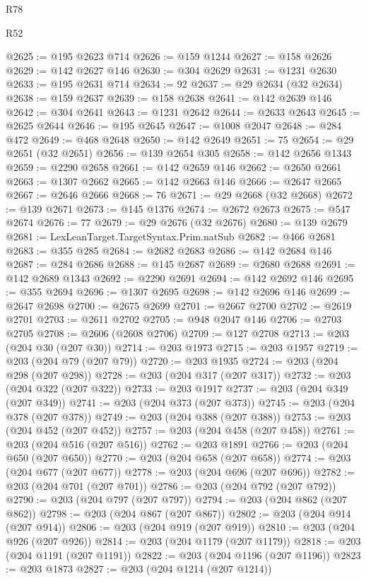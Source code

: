 \begin{lexlean}{R78}
\begin{lexlean}{R52}
\begin{coremodule}
{{{{{{{{{{{{{{{{{{{{{{{{{{{{{{{{{{{{{{{{{{{{{{{{{{{{{{{{{{{{{{{{{{{{{{{{{{{{{{{{{{{{{{{{{{{{{{{{{{{{{{{{{{{{{{{{{{{{{{{{{{{{{{{{{{{{{{{{{{{{{{{{{{{{{{{{{{{{{{{{{{{{{{{{{{{{{{{{{{{{{{{{{{{{{{{{{{{{{{@2625 := @195 @2623 @714
@2626 := @159 @1244
@2627 := @158 @2626
@2629 := @142 @2627 @146
@2630 := @304 @2629
@2631 := @1231 @2630
@2633 := @195 @2631 @714
@2634 := 92
@2637 := @29 @2634 (@32 @2634)
@2638 := @159 @2637
@2639 := @158 @2638
@2641 := @142 @2639 @146
@2642 := @304 @2641
@2643 := @1231 @2642
@2644 := @2633 @2643
@2645 := @2625 @2644
@2646 := @195 @2645
@2647 := @1008 @2047
@2648 := @284 @472
@2649 := @468 @2648
@2650 := @142 @2649
@2651 := 75
@2654 := @29 @2651 (@32 @2651)
@2656 := @139 @2654 @305
@2658 := @142 @2656 @1343
@2659 := @2290 @2658
@2661 := @142 @2659 @146
@2662 := @2650 @2661
@2663 := @1307 @2662
@2665 := @142 @2663 @146
@2666 := @2647 @2665
@2667 := @2646 @2666
@2668 := 76
@2671 := @29 @2668 (@32 @2668)
@2672 := @139 @2671
@2673 := @145 @1376
@2674 := @2672 @2673
@2675 := @547 @2674
@2676 := 77
@2679 := @29 @2676 (@32 @2676)
@2680 := @139 @2679
@2681 := LexLeanTarget.TargetSyntax.Prim.natSub
@2682 := @466 @2681
@2683 := @355 @285
@2684 := @2682 @2683
@2686 := @142 @2684 @146
@2687 := @284 @2686
@2688 := @145 @2687
@2689 := @2680 @2688
@2691 := @142 @2689 @1343
@2692 := @2290 @2691
@2694 := @142 @2692 @146
@2695 := @355 @2694
@2696 := @1307 @2695
@2698 := @142 @2696 @146
@2699 := @2647 @2698
@2700 := @2675 @2699
@2701 := @2667 @2700
@2702 := @2619 @2701
@2703 := @2611 @2702
@2705 := @948 @2047 @146
@2706 := @2703 @2705
@2708 := @2606 (@2608 @2706)
@2709 := @127 @2708
@2713 := @203 (@204 @30 (@207 @30))
@2714 := @203 @1973
@2715 := @203 @1957
@2719 := @203 (@204 @79 (@207 @79))
@2720 := @203 @1935
@2724 := @203 (@204 @298 (@207 @298))
@2728 := @203 (@204 @317 (@207 @317))
@2732 := @203 (@204 @322 (@207 @322))
@2733 := @203 @1917
@2737 := @203 (@204 @349 (@207 @349))
@2741 := @203 (@204 @373 (@207 @373))
@2745 := @203 (@204 @378 (@207 @378))
@2749 := @203 (@204 @388 (@207 @388))
@2753 := @203 (@204 @452 (@207 @452))
@2757 := @203 (@204 @458 (@207 @458))
@2761 := @203 (@204 @516 (@207 @516))
@2762 := @203 @1891
@2766 := @203 (@204 @650 (@207 @650))
@2770 := @203 (@204 @658 (@207 @658))
@2774 := @203 (@204 @677 (@207 @677))
@2778 := @203 (@204 @696 (@207 @696))
@2782 := @203 (@204 @701 (@207 @701))
@2786 := @203 (@204 @792 (@207 @792))
@2790 := @203 (@204 @797 (@207 @797))
@2794 := @203 (@204 @862 (@207 @862))
@2798 := @203 (@204 @867 (@207 @867))
@2802 := @203 (@204 @914 (@207 @914))
@2806 := @203 (@204 @919 (@207 @919))
@2810 := @203 (@204 @926 (@207 @926))
@2814 := @203 (@204 @1179 (@207 @1179))
@2818 := @203 (@204 @1191 (@207 @1191))
@2822 := @203 (@204 @1196 (@207 @1196))
@2823 := @203 @1873
@2827 := @203 (@204 @1214 (@207 @1214))
}}}}}}}}}}}}}}}}}}}}}}}}}}}}}}}}}}}}}}}}}}}}}}}}}}}}}}}}}}}}}}}}}}}}}}}}}}}}}}}}}}}}}}}}}}}}}}}}}}}}}}}}}}}}}}}}}}}}}}}}}}}}}}}}}}}}}}}}}}}}}}}}}}}}}}}}}}}}}}}}}}}}}}}}}}}}}}}}}}}}}}}}}}}}}}}}}}}}}}
\end{coremodule}
\end{lexlean}
\end{lexlean}

